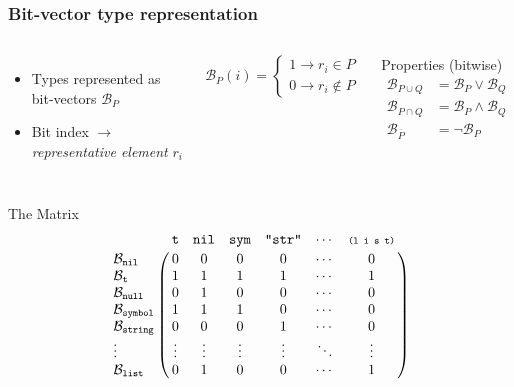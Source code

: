 \documentclass[aspectratio=169]{beamer}
\renewcommand\code[1]{\texttt{#1}}
\newcommand\rarr{\ensuremath{\rightarrow}}
\begin{document}
\newcommand\bs{\ensuremath{\mathcal B}}
\begin{frame}[fragile]
  \frametitle{Bit-vector type representation}
  \begin{columns}
    \begin{itemize}
    \item Types represented as bit-vectors $\bs_P$
    \item Bit index \rarr{} \emph{representative element} $r_i$
    \end{itemize}

    \[
      \bs_P(i) =
      \begin{cases}
        1 \rarr r_i \in P \\
        0 \rarr r_i \not\in P
      \end{cases}
    \]

    \begin{block}{Properties (bitwise)}
      \vspace*{-1em}
      \begin{align*}
        \bs_{P \cup Q} &= \bs_P \vee \bs_Q\\
        \bs_{P \cap Q} &= \bs_P \wedge \bs_Q\\
        \bs_{\overline P} &= \neg\bs_P
      \end{align*}
    \end{block}
  \end{columns}

  \begin{popup}{.75}
    \begin{macosbox}{The Matrix}
      \renewcommand\bs[1]{\ensuremath{\mathcal B_{\scriptsize\code{#1}}}}
      \[
        \bordermatrix{
          &\code{t}&\code{nil}&\code{sym}&\code{"str"}&\cdots&\code{\scriptsize(l i s t)}\cr
          \bs{nil}     &0     &0     &0     &0     &\cdots&0\cr
          \bs{t} &1     &1     &1     &1     &\cdots&1\cr
          \bs{null}     &0     &1     &0     &0     &\cdots&0\cr
          \bs{symbol}     &1     &1     &1     &0     &\cdots&0\cr
          \bs{string}     &0     &0     &0     &1     &\cdots&0\cr
          \vdots  &\vdots&\vdots&\vdots&\vdots&\ddots&\vdots\cr
          \bs{list}     &0     &1     &0     &0     &\cdots&1\cr
        }
      \]
    \end{macosbox}
  \end{popup}
\end{frame}
\end{document}
